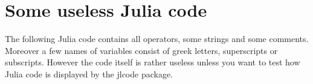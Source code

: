 \documentclass[11pt, a4paper]{scrartcl}
\begin{document}
\section*{Some useless Julia code}
The following Julia code contains all operators, some strings and some comments.
Moreover a few names of variables consist of greek letters, superscripts or
subscripts. However the code itself is rather useless unless you want to test
how Julia code is displayed by the jlcode package.


\end{document}
